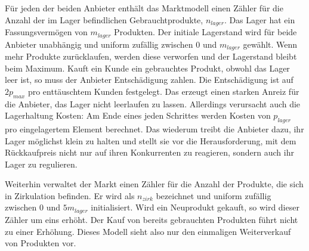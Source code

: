 Für jeden der beiden Anbieter enthält das Marktmodell einen Zähler für die Anzahl der im Lager befindlichen Gebrauchtprodukte, $n_{lager}$.
Das Lager hat ein Fassungsvermögen von $m_{lager}$ Produkten.
Der initiale Lagerstand wird für beide Anbieter unabhängig und uniform zufällig zwischen $0$ und $m_{lager}$ gewählt.
Wenn mehr Produkte zurücklaufen, werden diese verworfen und der Lagerstand bleibt beim Maximum.
Kauft ein Kunde ein gebrauchtes Produkt, obwohl das Lager leer ist, so muss der Anbieter Entschädigung zahlen.
Die Entschädigung ist auf $2 p_{max}$ pro enttäuschtem Kunden festgelegt.
Das erzeugt einen starken Anreiz für die Anbieter, das Lager nicht leerlaufen zu lassen.
Allerdings verursacht auch die Lagerhaltung Kosten: Am Ende eines jeden Schrittes werden Kosten von $p_{lager}$ pro eingelagertem Element berechnet.
Das wiederum treibt die Anbieter dazu, ihr Lager möglichst klein zu halten und stellt sie vor die Herausforderung, mit dem Rückkaufpreis nicht nur auf ihren Konkurrenten zu reagieren, sondern auch ihr Lager zu regulieren.

Weiterhin verwaltet der Markt einen Zähler für die Anzahl der Produkte, die sich in Zirkulation befinden.
Er wird als $n_{zirk}$ bezeichnet und uniform zufällig zwischen $0$ und $5 m_{lager}$ initialisiert.
Wird ein Neuprodukt gekauft, so wird dieser Zähler um eins erhöht.
Der Kauf von bereits gebrauchten Produkten führt nicht zu einer Erhöhung.
Dieses Modell sieht also nur den einmaligen Weiterverkauf von Produkten vor.

